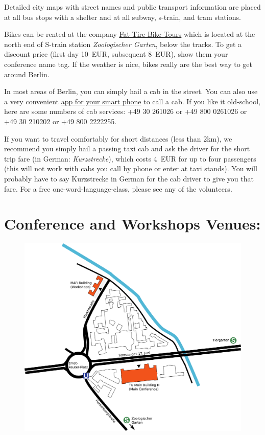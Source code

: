 Detailed city maps with street names and public transport information are placed at all bus stops with a shelter and at all subway, s-train, and tram stations.

Bikes can be rented at the company \href{http://fattirebiketours.com/berlin}{Fat Tire Bike Tours} which is located at the north end of S-train station \emph{Zoologischer Garten}, below the tracks. To get a discount price (first day 10~EUR, subsequent 8~EUR), show them your conference name tag. If the weather is nice, bikes really are the best way to get around Berlin.

In most areas of Berlin, you can simply hail a cab in the street. You can also use a very convenient \href{http://www.mytaxi.com/en/home.html}{app for your smart phone} to call a cab.  If you like it old-school, here are some numbers of cab services: +49 30 261026 or +49 800 0261026 or +49 30 210202 or +49 800 2222255.

If you want to travel comfortably for short distances (less than 2km), we recommend you simply hail a passing taxi cab  and ask the driver for the short trip fare (in German: \emph{Kurzstrecke}), which costs 4~EUR for up to four passengers (this will not work with cabs you call by phone or enter at taxi stands).  You will probably have to say Kurzstrecke in German for the cab driver to give you that fare. For a free one-word-language-class, please see any of the volunteers. 

\clearpage
{} \section{Conference and Workshops Venues:}
\begin{figure}[h!]
\includegraphics[width=\linewidth]{local_img/maps/RSS_Campus_Map}
\end{figure}

